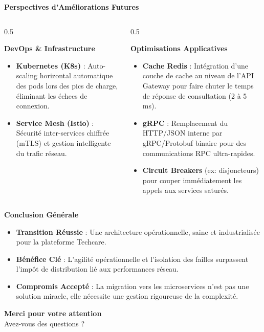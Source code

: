 \documentclass[10pt,aspectratio=169]{beamer}
\begin{document}
\begin{frame}{\textbf{Perspectives d'Améliorations Futures}}
    \begin{columns}
        \begin{column}{0.5\textwidth}
            \begin{block}{\textbf{DevOps \& Infrastructure}}
                \begin{itemize}
                    \item \textbf{Kubernetes (K8s)} : Auto-scaling horizontal automatique des pods lors des pics de charge, éliminant les échecs de connexion.
                    \item \textbf{Service Mesh (Istio)} : Sécurité inter-services chiffrée (mTLS) et gestion intelligente du trafic réseau.
                \end{itemize}
            \end{block}
        \end{column}
        \begin{column}{0.5\textwidth}
            \begin{block}{\textbf{Optimisations Applicatives}}
                \begin{itemize}
                    \item \textbf{Cache Redis} : Intégration d'une couche de cache au niveau de l'API Gateway pour faire chuter le temps de réponse de consultation (2 à 5 ms).
                    \item \textbf{gRPC} : Remplacement du HTTP/JSON interne par gRPC/Protobuf binaire pour des communications RPC ultra-rapides.
                    \item \textbf{Circuit Breakers} (ex: disjoncteurs) pour couper immédiatement les appels aux services saturés.
                \end{itemize}
            \end{block}
        \end{column}
    \end{columns}
\end{frame}

\begin{frame}{\textbf{Conclusion Générale}}
    \begin{itemize}
        \item \textbf{Transition Réussie} : Une architecture opérationnelle, saine et industrialisée pour la plateforme Techcare.
        \item \textbf{Bénéfice Clé} : L'agilité opérationnelle et l'isolation des failles surpassent l'impôt de distribution lié aux performances réseau.
        \item \textbf{Compromis Accepté} : La migration vers les microservices n'est pas une solution miracle, elle nécessite une gestion rigoureuse de la complexité.
    \end{itemize}
\end{frame}

\begin{frame}
    \begin{center}
        \color{insinavy}\Huge\textbf{Merci pour votre attention} \\[3ex]
        \color{insiturquoise}\Large
        Avez-vous des questions ?
    \end{center}
\end{frame}
\end{document}
